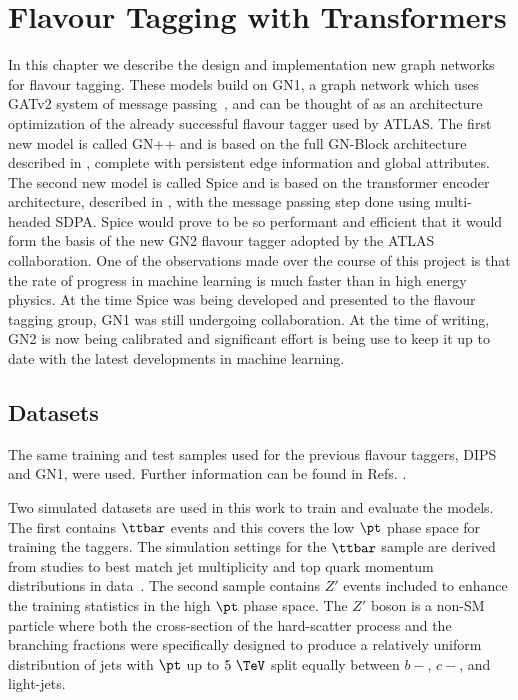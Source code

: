 
\chapter{Flavour Tagging with Transformers}
\label{ch:spice}

In this chapter we describe the design and implementation new graph networks for flavour tagging.
These models build on GN1, a graph network which uses GATv2 system of message passing~\cite{GATv2}, and can be thought of as an architecture optimization of the already successful flavour tagger used by ATLAS.
The first new model is called GN++ and is based on the full GN-Block architecture described in , complete with persistent edge information and global attributes.
The second new model is called Spice and is based on the transformer encoder architecture, described in , with the message passing step done using multi-headed SDPA.
Spice would prove to be so performant and efficient that it would form the basis of the new GN2 flavour tagger adopted by the ATLAS collaboration.
One of the observations made over the course of this project is that the rate of progress in machine learning is much faster than in high energy physics.
At the time Spice was being developed and presented to the flavour tagging group, GN1 was still undergoing collaboration.
At the time of writing, GN2 is now being calibrated and significant effort is being use to keep it up to date with the latest developments in machine learning.

\section{Datasets}

The same training and test samples used for the previous flavour taggers, DIPS and GN1, were used.
Further information can be found in Refs. \cite{GN1, AlexThesis}.

Two simulated datasets are used in this work to train and evaluate the models.
The first contains $\ttbar$ events and this covers the low $\pt$ phase space for training the taggers.
The simulation settings for the $\ttbar$ sample are derived from studies to best match jet multiplicity and top quark momentum distributions in data~\cite{ttbar1, ttbar2}.
The second sample contains $Z'$ events included to enhance the training statistics in the high $\pt$ phase space.
The $Z'$ boson is a non-SM particle where both the cross-section of the hard-scatter process and the branching fractions were specifically designed to produce a relatively uniform distribution of jets with $\pt$ up to $5~\TeV$ split equally between $b-$, $c-$, and light-jets.


